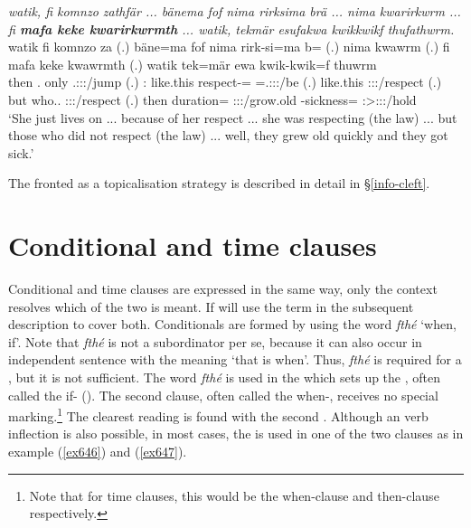 \begin{exe}
	\ex \emph{watik, fi komnzo zathfär ... bänema fof nima rirksima brä ... nima kwarirkwrm ... fi \textbf{mafa keke kwarirkwrmth} ... watik, tekmär esufakwa kwikkwikf thufathwrm.}\\
	\gll watik fi komnzo za (.) bäne=ma fof nima rirk-si=ma b= (.) nima kwawrm (.) fi mafa keke kwawrmth (.) watik tek=mär ewa kwik-kwik=f thuwrm\\
	then \Third.\Abs{} only \Tsg.\F:\Sbj:\Rpst:\Pfv/jump (.) \Dem:\Med{} \Emph{} {like.this} respect-\Nmlz=\Char{} \Med=\Tsg.\F:\Sbj:\Nonpast:\Ipfv/be (.) {like.this} \Stsg:\Sbj:\Pst:\Dur/respect (.) but who.\Nsg.\Erg{} \Neg{} \Stpl:\Sbj:\Pst:\Dur/respect (.) then duration=\Priv{} \Stpl:\Sbj:\Pst:\Ipfv/grow.old \Redup-sickness=\Erg{} \Stsg:\Sbj>\Stpl:\Obj:\Pst:\Dur/hold\\
	\trans `She just lives on ... because of her respect ... she was respecting (the law) ... but those who did not respect (the law) ... well, they grew old quickly and they got sick.'
	\label{ex555}
\end{exe}

The fronted  as a topicalisation strategy is described in detail in \S{}\ref{info-cleft}.

\section{Conditional and time clauses}\label{condiclauses}

Conditional and time clauses are expressed in the same way, only the context resolves which of the two is meant. If will use the term  in the subsequent description to cover both. Conditionals are formed by using the word \emph{fthé} `when, if'. Note that \emph{fthé} is not a subordinator per se, because it can also occur in independent sentence with the meaning `that is when'. Thus, \emph{fthé} is required for a , but it is not sufficient. The word \emph{fthé} is used in the  which sets up the , often called the if- (\citealt[255]{Thompson:2007relclauses}). The second clause, often called the when-, receives no special marking.\footnote{Note that for time clauses, this would be the when-clause and then-clause respectively.} The clearest  reading is found with the second . Although an  verb inflection is also possible, in most cases, the  is used in one of the two clauses as in example (\ref{ex646}) and (\ref{ex647}).

